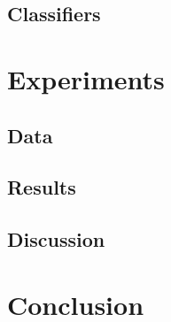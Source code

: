 \documentclass[runningheads]{llncs}
\begin{document}
\subsection{Classifiers}
\section{Experiments}
\subsection{Data}
\subsection{Results}
\subsection{Discussion}
\section{Conclusion}



\end{document}
